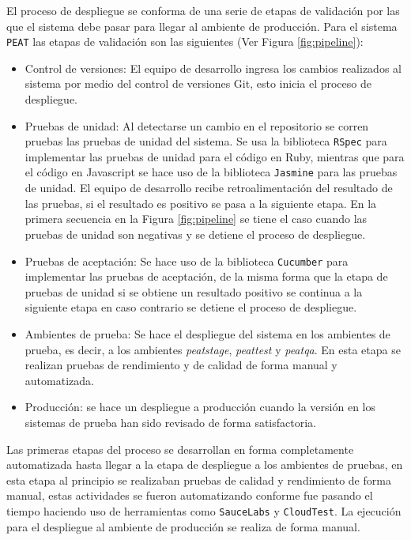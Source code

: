 El proceso de despliegue se conforma de una serie de etapas de validación por las
que el sistema debe pasar para llegar al ambiente de producción. Para el sistema
\texttt{PEAT} las etapas de validación son las siguientes (Ver Figura
\ref{fig:pipeline}):
\begin{itemize}
\item Control de versiones: El equipo de desarrollo ingresa los cambios
  realizados al sistema por medio del control de versiones Git, esto inicia
  el proceso de despliegue.
\item Pruebas de unidad: Al detectarse un cambio en el repositorio se corren
  pruebas las pruebas de unidad del sistema. Se usa la biblioteca \texttt{RSpec}
  para implementar las pruebas de unidad para el código en Ruby, mientras que para
  el código en Javascript se hace uso de la biblioteca \texttt{Jasmine} para las
  pruebas de unidad. El equipo de desarrollo recibe retroalimentación del resultado
  de las pruebas, si el resultado es positivo se pasa a la siguiente etapa.
  En la primera secuencia en la Figura \ref{fig:pipeline} se tiene el caso
  cuando las pruebas de unidad son negativas y se detiene el proceso de despliegue.
\item Pruebas de aceptación: Se hace uso de la biblioteca \texttt{Cucumber}
  para implementar las pruebas de aceptación, de la misma forma que la etapa de
  pruebas de unidad si se obtiene un resultado positivo se continua a la siguiente
  etapa en caso contrario se detiene el proceso de despliegue.
\item Ambientes de prueba: Se hace el despliegue del sistema en los ambientes de
  prueba, es decir, a los ambientes \textit{peatstage}, \textit{peattest} y
  \textit{peatqa}. En esta etapa se realizan pruebas de rendimiento y de calidad
  de forma manual y automatizada.
\item Producción: se hace un despliegue a producción cuando la versión en los
  sistemas de prueba han sido revisado de forma satisfactoria.
\end{itemize}


Las primeras etapas del proceso se desarrollan en forma completamente automatizada
hasta llegar a la etapa de despliegue a los ambientes de pruebas, en esta etapa
al principio se realizaban pruebas de calidad y rendimiento de forma manual, estas
actividades se fueron automatizando conforme fue pasando el tiempo haciendo uso de
herramientas como \texttt{SauceLabs} y \texttt{CloudTest}. La ejecución para
el despliegue al ambiente de producción se realiza de forma manual.

